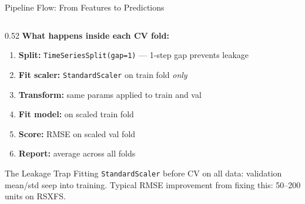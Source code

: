 \documentclass[aspectratio=169, 10pt]{beamer}
\begin{document}
\begin{frame}{Pipeline Flow: From Features to Predictions}
\begin{columns}[T]
\begin{column}{0.52\textwidth}
      \textbf{What happens inside each CV fold:}
      {\footnotesize\begin{enumerate}
        \item \textbf{Split:} \texttt{TimeSeriesSplit(gap=1)}
              --- 1-step gap prevents leakage
        \item \textbf{Fit scaler:} \texttt{StandardScaler}
              on train fold \emph{only}
        \item \textbf{Transform:} same params applied
              to train and val
        \item \textbf{Fit model:} on scaled train fold
        \item \textbf{Score:} RMSE on scaled val fold
        \item \textbf{Report:} average across all folds
      \end{enumerate}}

      \begin{examplebox}{The Leakage Trap}
        \footnotesize
        Fitting \texttt{StandardScaler} before CV
        on all data: validation mean/std seep into
        training. Typical RMSE improvement from
        fixing this: 50--200 units on RSXFS.
      \end{examplebox}
    \end{column}
  \end{columns}
\end{frame}
\end{document}

